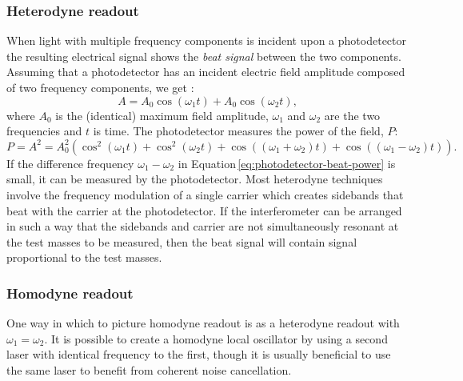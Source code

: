 \subsubsection{Heterodyne readout}
When light with multiple frequency components is incident upon a photodetector the resulting electrical signal shows the \emph{beat signal} between the two components. Assuming that a photodetector has an incident electric field amplitude composed of two frequency components, we get \cite{Freise2010}:
\begin{equation}
  A = A_0 \cos \left( \omega_1 t \right) + A_0 \cos \left( \omega_2 t \right),
\end{equation}
where $A_0$ is the (identical) maximum field amplitude, $\omega_1$ and $\omega_2$ are the two frequencies and $t$ is time. The photodetector measures the power of the field, $P$:
\begin{equation}
  \label{eq:photodetector-beat-power}
  P = A^2 = A_0^2 \left( \cos^2 \left( \omega_1 t \right) + \cos^2 \left( \omega_2 t \right) + \cos \left( \left( \omega_1 + \omega_2 \right) t \right) + \cos \left( \left( \omega_1 - \omega_2 \right) t \right) \right).
\end{equation}
If the difference frequency $\omega_1 - \omega_2$ in Equation\,\ref{eq:photodetector-beat-power} is small, it can be measured by the photodetector. Most heterodyne techniques involve the frequency modulation of a single carrier which creates sidebands that beat with the carrier at the photodetector. If the interferometer can be arranged in such a way that the sidebands and carrier are not simultaneously resonant at the test masses to be measured, then the beat signal will contain signal proportional to the test masses.

\subsubsection{\label{sec:homodyne-readout}Homodyne readout}
One way in which to picture homodyne readout is as a heterodyne readout with $\omega_1 = \omega_2$. It is possible to create a homodyne local oscillator by using a second laser with identical frequency to the first, though it is usually beneficial to use the same laser to benefit from coherent noise cancellation.

